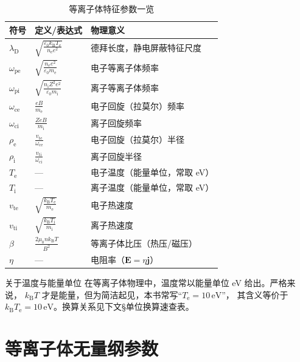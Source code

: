 \documentclass[12pt,a4paper,openany,oneside]{book}
\newcommand{\ii}{\mathrm{i}}
\newcommand{\ee}{\mathrm{e}}
\newcommand{\eps}{\varepsilon}
\newcommand{\vect}[1]{\bm{#1}}
\begin{document}
\begin{table}[htbp]
\centering
\caption{等离子体特征参数一览}
\begin{tabular}{@{}llp{6.5cm}@{}}
\toprule
\textbf{符号} & \textbf{定义/表达式} & \textbf{物理意义} \\
\midrule
$\lambda_\mathrm{D}$ & $\displaystyle\sqrt{\frac{\eps_0 k_\mathrm{B} T_\ee}{n_\ee e^2}}$ & 德拜长度，静电屏蔽特征尺度 \\
$\omega_{\mathrm{p}\ee}$ & $\displaystyle\sqrt{\frac{n_\ee e^2}{\eps_0 m_\ee}}$ & 电子等离子体频率 \\
$\omega_{\mathrm{p}\ii}$ & $\displaystyle\sqrt{\frac{n_\ii Z^2 e^2}{\eps_0 m_\ii}}$ & 离子等离子体频率 \\
$\omega_{\mathrm{c}\ee}$ & $\displaystyle\frac{e B}{m_\ee}$ & 电子回旋（拉莫尔）频率 \\
$\omega_{\mathrm{c}\ii}$ & $\displaystyle\frac{Z e B}{m_\ii}$ & 离子回旋频率 \\
$\rho_\ee$ & $\displaystyle\frac{v_{\mathrm{t}\ee}}{\omega_{\mathrm{c}\ee}}$ & 电子回旋（拉莫尔）半径 \\
$\rho_\ii$ & $\displaystyle\frac{v_{\mathrm{t}\ii}}{\omega_{\mathrm{c}\ii}}$ & 离子回旋半径 \\
$T_\ee$ & — & 电子温度（能量单位，常取 eV） \\
$T_\ii$ & — & 离子温度（能量单位，常取 eV） \\
$v_{\mathrm{t}\ee}$ & $\displaystyle\sqrt{\frac{k_\mathrm{B} T_\ee}{m_\ee}}$ & 电子热速度 \\
$v_{\mathrm{t}\ii}$ & $\displaystyle\sqrt{\frac{k_\mathrm{B} T_\ii}{m_\ii}}$ & 离子热速度 \\
$\beta$ & $\displaystyle\frac{2\mu_0 n k_\mathrm{B} T}{B^2}$ & 等离子体比压（热压/磁压） \\
$\eta$ & — & 电阻率（$\vect{E}=\eta\vect{j}$） \\
\bottomrule
\end{tabular}
\end{table}

\begin{insight}{关于温度与能量单位}{}
在等离子体物理中，温度常以能量单位 eV 给出。严格来说，
$k_\mathrm{B} T$ 才是能量，但为简洁起见，本书常写“$T_\ee=10\,\mathrm{eV}$”，
其含义等价于 $k_\mathrm{B} T_\ee=10\,\mathrm{eV}$。换算关系见下文\S 单位换算速查表。
\end{insight}


\section*{等离子体无量纲参数}
\end{document}
